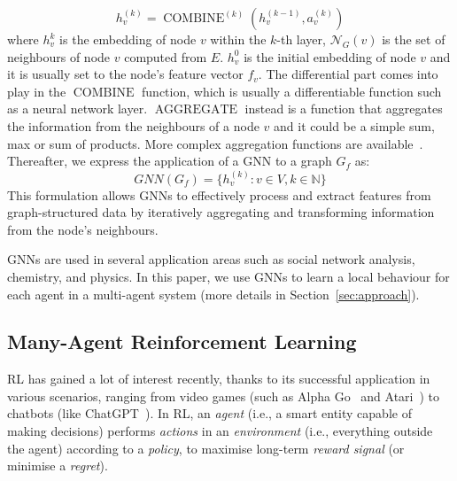 \documentclass[conference]{IEEEtran}
\begin{document}
\begin{equation}
h_{v}^{(k)}=\operatorname{COMBINE}^{(k)}\left(h_{v}^{(k-1)}, a_{v}^{(k)}\right)
\end{equation}
where $h_{v}^{k}$ is the embedding of node $v$ within the $k$-th layer, 
 $\mathcal{N}_G(v)$ is the set of neighbours of node $v$ computed from $E$.
%
$h_v^0$ is the initial embedding of node $v$ and it is usually set to the node's feature vector $f_v$.
%
The differential part comes into play in the $\operatorname{COMBINE}$ function, 
 which is usually a differentiable function such as a neural network layer.
%
$\operatorname{AGGREGATE} $ instead is a function that aggregates the information from the neighbours of a node $v$
 and it could be a simple sum, max or sum of products. 
 More complex aggregation functions are available~\cite{pellegrini2020learning}.
%
Thereafter, we express the application of a \ac{GNN} to a graph $G_f$ as:
\begin{equation}
GNN(G_f) = \{h_v^{(k)}: v \in V, k \in \mathbb{N}\}
\end{equation} 
This formulation allows \acp{GNN} to effectively process and extract features from graph-structured data by iteratively aggregating and transforming information from the node's neighbours.

\acp{GNN} are used in several application areas such as social network analysis, chemistry, and physics.
 In this paper, we use \acp{GNN} to learn a local behaviour for each agent in a multi-agent system (more details in Section~\ref{sec:approach}).
\subsection{Many-Agent Reinforcement Learning}

 \Ac{RL} has gained a lot of interest recently, 
 thanks to its successful application in various scenarios, 
 ranging from video games (such as Alpha Go~\cite{Silver2016Go} and Atari~\cite{Atari2016DQN}) 
 to chatbots (like ChatGPT~\cite{ChatGPT2023}). 
% 
In \ac{RL}, an \emph{agent} (i.e., a smart entity capable of making decisions) 
 performs \emph{actions} in an \emph{environment} (i.e., everything outside the agent) according to a \emph{policy}, 
 to maximise long-term \emph{reward signal} (or minimise a \emph{regret}).
\end{document}
